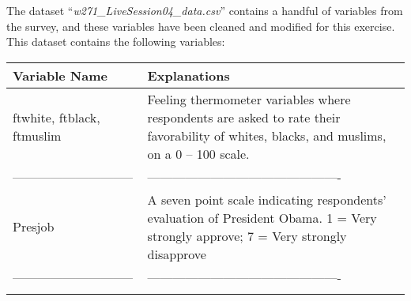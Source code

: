 \documentclass[]{article}
\begin{document}
The dataset ``\emph{w271\_LiveSession04\_data.csv}'' contains a handful
of variables from the survey, and these variables have been cleaned and
modified for this exercise. This dataset contains the following
variables:

\begin{longtable}[]{@{}ll@{}}
\toprule
\begin{minipage}[b]{0.37\columnwidth}\raggedright\strut
\textbf{Variable Name}\strut
\end{minipage} & \begin{minipage}[b]{0.57\columnwidth}\raggedright\strut
\textbf{Explanations}\strut
\end{minipage}\tabularnewline
\midrule
\endhead
\begin{minipage}[t]{0.37\columnwidth}\raggedright\strut
ftwhite, ftblack, ftmuslim\strut
\end{minipage} & \begin{minipage}[t]{0.57\columnwidth}\raggedright\strut
Feeling thermometer variables where respondents are asked to rate their
favorability of whites, blacks, and muslims, on a 0 -- 100 scale.\strut
\end{minipage}\tabularnewline
\begin{minipage}[t]{0.37\columnwidth}\raggedright\strut
-----------------------------\strut
\end{minipage} & \begin{minipage}[t]{0.57\columnwidth}\raggedright\strut
----------------------------------------------\strut
\end{minipage}\tabularnewline
\begin{minipage}[t]{0.37\columnwidth}\raggedright\strut
Presjob\strut
\end{minipage} & \begin{minipage}[t]{0.57\columnwidth}\raggedright\strut
A seven point scale indicating respondents' evaluation of President
Obama. 1 = Very strongly approve; 7 = Very strongly disapprove\strut
\end{minipage}\tabularnewline
\begin{minipage}[t]{0.37\columnwidth}\raggedright\strut
-----------------------------\strut
\end{minipage} & \begin{minipage}[t]{0.57\columnwidth}\raggedright\strut
----------------------------------------------\strut
\end{minipage}\tabularnewline
\begin{minipage}[t]{0.37\columnwidth}\raggedright\strut

\end{minipage}
\end{longtable}
\end{document}
